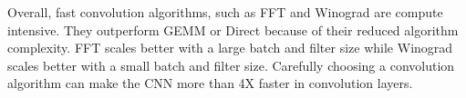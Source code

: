 Overall, fast convolution algorithms, such as \textsf{FFT} and \textsf{Winograd} are compute intensive. They outperform \textsf{GEMM} or \textsf{Direct} because of their reduced algorithm complexity. \textsf{FFT} scales better with a large batch and filter size while \textsf{Winograd} scales better with a small batch and filter size. Carefully choosing a convolution algorithm can make the CNN more than 4X faster in convolution layers. 